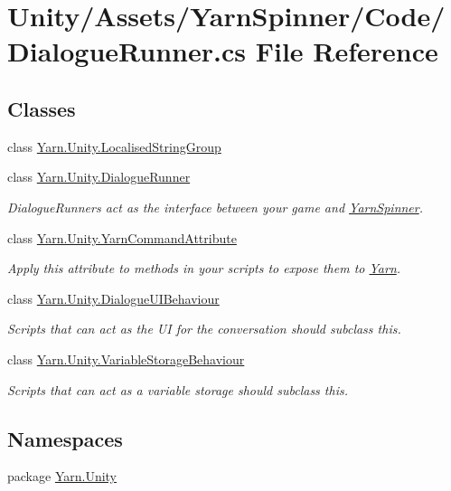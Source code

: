 \hypertarget{a00277}{\section{Unity/\-Assets/\-Yarn\-Spinner/\-Code/\-Dialogue\-Runner.cs File Reference}
\label{a00277}
}
\subsection*{Classes}
\begin{DoxyCompactItemize}
\item 
class \hyperlink{a00125_a00360}{Yarn.\-Unity.\-Localised\-String\-Group}
\item 
class \hyperlink{a00083}{Yarn.\-Unity.\-Dialogue\-Runner}
\begin{DoxyCompactList}\small\item\em Dialogue\-Runners act as the interface between your game and \hyperlink{a00353}{Yarn\-Spinner}. \end{DoxyCompactList}\item 
class \hyperlink{a00183}{Yarn.\-Unity.\-Yarn\-Command\-Attribute}
\begin{DoxyCompactList}\small\item\em Apply this attribute to methods in your scripts to expose them to \hyperlink{a00041}{Yarn}. \end{DoxyCompactList}\item 
class \hyperlink{a00085}{Yarn.\-Unity.\-Dialogue\-U\-I\-Behaviour}
\begin{DoxyCompactList}\small\item\em Scripts that can act as the U\-I for the conversation should subclass this. \end{DoxyCompactList}\item 
class \hyperlink{a00181}{Yarn.\-Unity.\-Variable\-Storage\-Behaviour}
\begin{DoxyCompactList}\small\item\em Scripts that can act as a variable storage should subclass this. \end{DoxyCompactList}\end{DoxyCompactItemize}
\subsection*{Namespaces}
\begin{DoxyCompactItemize}
\item 
package \hyperlink{a00125}{Yarn.\-Unity}
\end{DoxyCompactItemize}


